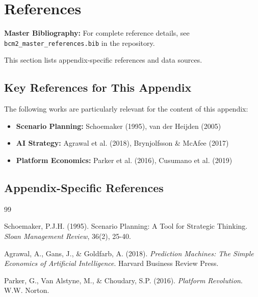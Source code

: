 \section{References}
\label{sec:vvv1-references}

\begin{tcolorbox}[colback=blue!5!white, colframe=blue!75!black]
\textbf{Master Bibliography:} For complete reference details, see
\texttt{bcm2\_master\_references.bib} in the repository.

This section lists appendix-specific references and data sources.
\end{tcolorbox}

\vspace{0.5em}

\subsection{Key References for This Appendix}

The following works are particularly relevant for the content of this appendix:

\begin{itemize}[nosep]
    \item \textbf{Scenario Planning:} Schoemaker (1995), van der Heijden (2005)
    \item \textbf{AI Strategy:} Agrawal et al. (2018), Brynjolfsson \& McAfee (2017)
    \item \textbf{Platform Economics:} Parker et al. (2016), Cusumano et al. (2019)
\end{itemize}

\subsection{Appendix-Specific References}

\begin{thebibliography}{99}

 Schoemaker, P.J.H. (1995). Scenario Planning: A Tool for Strategic Thinking. \textit{Sloan Management Review}, 36(2), 25-40.

 Agrawal, A., Gans, J., \& Goldfarb, A. (2018). \textit{Prediction Machines: The Simple Economics of Artificial Intelligence}. Harvard Business Review Press.

 Parker, G., Van Alstyne, M., \& Choudary, S.P. (2016). \textit{Platform Revolution}. W.W. Norton.

\end{thebibliography}

